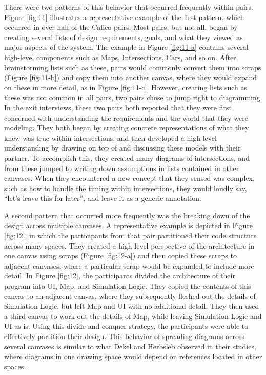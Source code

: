 There were two patterns of this behavior that occurred frequently within pairs. Figure \ref{fig:11} illustrates a representative example of the first pattern, which occurred in over half of the Calico pairs. Most pairs, but not all, began by creating several lists of design requirements, goals, and what they viewed as major aspects of the system. The example in Figure \ref{fig:11-a} contains several high-level components such as Maps, Intersections, Cars, and so on. After brainstorming lists such as these, pairs would commonly convert them into scraps (Figure \ref{fig:11-b}) and copy them into another canvas, where they would expand on these in more detail, as in Figure \ref{fig:11-c}. However, creating lists such as these was not common in all pairs, two pairs chose to jump right to diagramming. In the exit interviews, these two pairs both reported that they were first concerned with understanding the requirements and the world that they were modeling. They both began by creating concrete representations of what they knew was true within intersections, and then developed a high level understanding by drawing on top of and discussing these models with their partner. To accomplish this, they created many diagrams of intersections, and from these jumped to writing down assumptions in lists contained in other canvases. When they encountered a new concept that they sensed was complex, such as how to handle the timing within intersections, they would loudly say, ``let's leave this for later'', and leave it as a generic annotation.

A second pattern that occurred more frequently was the breaking down of the design across multiple canvases. A representative example is depicted in Figure \ref{fig:12}, in which the participants from that pair partitioned their code structure across many spaces. They created a high level perspective of the architecture in one canvas using scraps (Figure \ref{fig:12-a}) and then copied these scraps to adjacent canvases, where a particular scrap would be expanded to include more detail. In Figure \ref{fig:12}, the participants divided the architecture of their program into UI, Map, and Simulation Logic. They copied the contents of this canvas to an adjacent canvas, where they subsequently fleshed out the details of Simulation Logic, but left Map and UI with no additional detail. They then used a third canvas to work out the details of Map, while leaving Simulation Logic and UI as is. Using this divide and conquer strategy, the participants were able to effectively partition their design. This behavior of spreading diagrams across several canvases is similar to what Dekel and Herbsleb \citep{dekel2007notation} observed in their studies, where diagrams in one drawing space would depend on references located in other spaces. 


